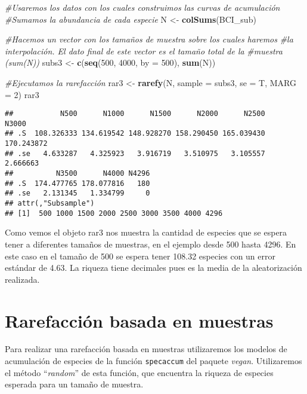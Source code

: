 \documentclass[]{book}
\newenvironment{Shaded}{\begin{snugshade}}{\end{snugshade}}
\newcommand{\KeywordTok}[1]{\textcolor[rgb]{0.13,0.29,0.53}{\textbf{{#1}}}}
\newcommand{\DataTypeTok}[1]{\textcolor[rgb]{0.13,0.29,0.53}{{#1}}}
\newcommand{\DecValTok}[1]{\textcolor[rgb]{0.00,0.00,0.81}{{#1}}}
\newcommand{\StringTok}[1]{\textcolor[rgb]{0.31,0.60,0.02}{{#1}}}
\newcommand{\CommentTok}[1]{\textcolor[rgb]{0.56,0.35,0.01}{\textit{{#1}}}}
\newcommand{\NormalTok}[1]{{#1}}
\begin{document}
\begin{Shaded}
\begin{Highlighting}[]
\CommentTok{#Usaremos los datos con los cuales construimos las curvas de acumulación}
\CommentTok{#Sumamos la abundancia de cada especie}
\NormalTok{N <-}\StringTok{ }\KeywordTok{colSums}\NormalTok{(BCI_sub) }

\CommentTok{#Hacemos un vector con los tamaños de muestra sobre los cuales haremos }
\CommentTok{#la interpolación. El dato final de este vector es el tamaño total de la }
\CommentTok{#muestra (sum(N))}
\NormalTok{subs3 <-}\StringTok{ }\KeywordTok{c}\NormalTok{(}\KeywordTok{seq}\NormalTok{(}\DecValTok{500}\NormalTok{, }\DecValTok{4000}\NormalTok{, }\DataTypeTok{by =} \DecValTok{500}\NormalTok{), }\KeywordTok{sum}\NormalTok{(N)) }

\CommentTok{#Ejecutamos la rarefacción}
\NormalTok{rar3 <-}\StringTok{ }\KeywordTok{rarefy}\NormalTok{(N, }\DataTypeTok{sample =} \NormalTok{subs3, }\DataTypeTok{se =} \NormalTok{T, }\DataTypeTok{MARG =} \DecValTok{2}\NormalTok{)}
\NormalTok{rar3}
\end{Highlighting}
\end{Shaded}

\begin{verbatim}
##           N500      N1000      N1500      N2000      N2500      N3000
## .S  108.326333 134.619542 148.928270 158.290450 165.039430 170.243872
## .se   4.633287   4.325923   3.916719   3.510975   3.105557   2.666663
##          N3500      N4000 N4296
## .S  174.477765 178.077816   180
## .se   2.131345   1.334799     0
## attr(,"Subsample")
## [1]  500 1000 1500 2000 2500 3000 3500 4000 4296
\end{verbatim}

Como vemos el objeto rar3 nos muestra la cantidad de especies que se
espera tener a diferentes tamaños de muestras, en el ejemplo desde 500
hasta 4296. En este caso en el tamaño de 500 se espera tener 108.32
especies con un error estándar de 4.63. La riqueza tiene decimales pues
es la media de la aleatorización realizada.

\section{Rarefacción basada en
muestras}\label{rarefaccion-basada-en-muestras}

Para realizar una rarefacción basada en muestras utilizaremos los
modelos de acumulación de especies de la función \texttt{specaccum} del
paquete \emph{vegan}. Utilizaremos el método ``\emph{random}'' de esta
función, que encuentra la riqueza de especies esperada para un tamaño de
muestra.
\end{document}
